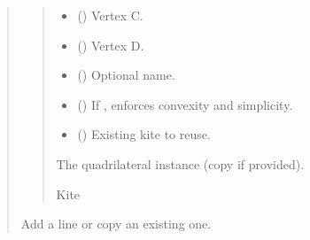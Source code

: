 \documentclass[letterpaper,10pt,english]{sphinxmanual}
\begin{document}
\begin{quote}
\begin{fulllineitems}
\begin{fulllineitems}
\begin{quote}
\begin{description}
\begin{itemize}
\item {} 
\sphinxAtStartPar
{} (\sphinxstyleliteralemphasis{\sphinxupquote{ | }}) \textendash{} Vertex C.

\item {} 
\sphinxAtStartPar
{} (\sphinxstyleliteralemphasis{\sphinxupquote{ | }}) \textendash{} Vertex D.

\item {} 
\sphinxAtStartPar
{} (\sphinxstyleliteralemphasis{\sphinxupquote{ | }}) \textendash{} Optional name.

\item {} 
\sphinxAtStartPar
{} () \textendash{} If , enforces convexity and simplicity.

\item {} 
\sphinxAtStartPar
{} (\sphinxstyleliteralemphasis{\sphinxupquote{ | }}) \textendash{} Existing kite to reuse.

\end{itemize}

\sphinxAtStartPar
The quadrilateral instance (copy if provided).

\sphinxAtStartPar
Kite

\end{description}\end{quote}

\end{fulllineitems}


\begin{fulllineitems}
\label{\detokenize{pygeox:pygeox.add_objects.AddNamespace.line}}
\pysigstartsignatures
\pysiglinewithargsret
{}
{\sphinxparamcomma {}\sphinxparamcomma {}\sphinxparamcomma {}}
{}
\pysigstopsignatures
\sphinxAtStartPar
Add a line or copy an existing one.


\end{fulllineitems}
\end{fulllineitems}
\end{quote}
\end{document}
